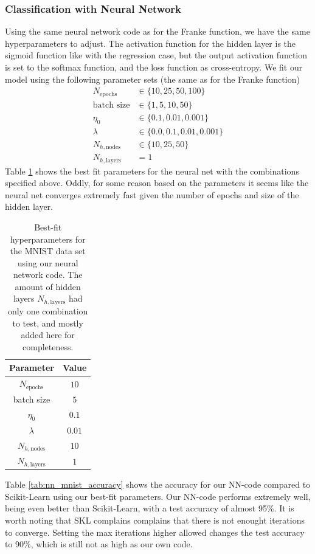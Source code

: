 \documentclass[a4paper]{article}
\newcommand{\Nepochs}{N_{\text{epochs}}}
\newcommand{\Nhn}{N_{h,\text{nodes}}}
\newcommand{\Nhl}{N_{h,\text{layers}}}
\begin{document}
\subsubsection{Classification with Neural Network}
Using the same neural network code as for the Franke function, we have the same hyperparameters to adjust. The activation function for the hidden layer is the sigmoid function like with the regression case, but the output activation function is set to the softmax function, and the loss function as cross-entropy. We fit our model using the following parameter sets (the same as for the Franke function)
\begin{align*}
	N_{\text{epochs}} &\in \{10, 25, 50, 100\}\\
	\text{batch size} &\in \{1, 5, 10, 50\}\\
	\eta_0 &\in \{0.1, 0.01, 0.001\}\\
	\lambda &\in \{0.0, 0.1, 0.01, 0.001\}\\
	\Nhn &\in \{10, 25, 50\}\\
	\Nhl &= 1
\end{align*}
Table \ref{tab:nn_mnist_best} shows the best fit parameters for the neural net with the combinations specified above. Oddly, for some reason based on the parameters it seems like the neural net converges extremely fast given the number of epochs and size of the hidden layer. 
\begin{table}[H]
  \centering
  \caption{Best-fit hyperparameters for the MNIST data set using our neural network code. The amount of hidden layers $\Nhl$ had only one combination to test, and mostly added here for completeness.}
  \label{tab:nn_mnist_best}
  \begin{tabular}{c|c}
    \hline\hline
    Parameter & Value\\\hline
    $\Nepochs$ &  $10$\\
    batch size &  $5$\\
    $\eta_0$ & $0.1$ \\
    $\lambda$ & $0.01$\\
    $\Nhn$ & $10$\\
    $\Nhl$ & $1$
    \end{tabular}
\end{table}
Table \ref{tab:nn_mnist_accuracy} shows the accuracy for our NN-code compared to Scikit-Learn using our best-fit parameters. Our NN-code performs extremely well, being even better than Scikit-Learn, with a test accuracy of almost 95\%. It is worth noting that SKL complains complains that there is not enought iterations to converge. Setting the max iterations higher allowed changes the test accuracy to 90\%, which is still not as high as our own code.
\end{document}

